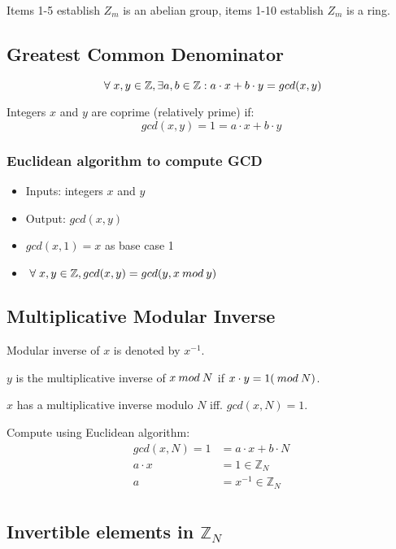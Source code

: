 \documentclass[a4paper]{article}
\begin{document}
Items 1-5 establish $Z_{m}$ is an abelian group, items 1-10 establish $Z_{m}$ is
a ring.

\subsection{Greatest Common Denominator}

\[\;\forall\; x, y \in \mathbb{Z}, \exists a, b \in \mathbb{Z} :
a \cdot x + b \cdot y = gcd(x, y)\]

Integers $x$ and $y$ are coprime (relatively prime) if:
\[gcd(x, y) = 1 = a \cdot x + b \cdot y\]

\subsubsection{Euclidean algorithm to compute GCD}

\begin{itemize}
  \item Inputs: integers $x$ and $y$
  \item Output: $gcd(x, y)$
  \item $gcd(x, 1) = x$ as base case 1
  \item $\;\forall\; x, y \in \mathbb{Z}, gcd(x, y) = gcd(y, x \: mod \: y)$
\end{itemize}

\subsection{Multiplicative Modular Inverse}

Modular inverse of $x$ is denoted by $x^{-1}$.

$y$ is the multiplicative inverse of $x \: mod \: N$ if $x \cdot y = 1 (\: mod \: N)$.

$x$ has a multiplicative inverse modulo $N$ iff. $gcd(x, N) = 1$.

Compute using Euclidean algorithm:
\begin{align*}
  gcd(x, N) = 1 &= a \cdot x + b \cdot N \\
  a \cdot x &= 1 \in \mathbb{Z}_{N} \\
  a &= x^{-1} \in \mathbb{Z}_{N} \\
\end{align*}

\subsection{Invertible elements in $\mathbb{Z}_{N}$}
\end{document}

